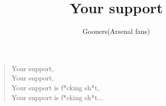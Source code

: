 \documentclass[a4paper,12pt]{article}
\title{Your support}
\author{Gooners(Arsenal fans)}
\date{}
\begin{document}
	
	\maketitle
	
	\begin{verse}
		
		Your support, \\
		Your support, \\
		Your support is f*cking sh*t, \\
		Your support is f*cking sh*t$\ldots$
		
	\end{verse}
	
\end{document}
